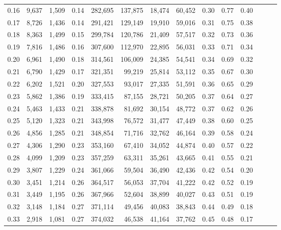 \begin{tabular}{rrrrrrrrrrrrrr}
0.16 &   9,637 &  1,509 &  0.14 &  282,695 &  137,875 &  18,474 &  60,452 &  0.30 &  0.77 &      0.40 \\
0.17 &   8,726 &  1,436 &  0.14 &  291,421 &  129,149 &  19,910 &  59,016 &  0.31 &  0.75 &      0.38 \\
0.18 &   8,363 &  1,499 &  0.15 &  299,784 &  120,786 &  21,409 &  57,517 &  0.32 &  0.73 &      0.36 \\
0.19 &   7,816 &  1,486 &  0.16 &  307,600 &  112,970 &  22,895 &  56,031 &  0.33 &  0.71 &      0.34 \\
0.20 &   6,961 &  1,490 &  0.18 &  314,561 &  106,009 &  24,385 &  54,541 &  0.34 &  0.69 &      0.32 \\
0.21 &   6,790 &  1,429 &  0.17 &  321,351 &   99,219 &  25,814 &  53,112 &  0.35 &  0.67 &      0.30 \\
0.22 &   6,202 &  1,521 &  0.20 &  327,553 &   93,017 &  27,335 &  51,591 &  0.36 &  0.65 &      0.29 \\
0.23 &   5,862 &  1,386 &  0.19 &  333,415 &   87,155 &  28,721 &  50,205 &  0.37 &  0.64 &      0.27 \\
0.24 &   5,463 &  1,433 &  0.21 &  338,878 &   81,692 &  30,154 &  48,772 &  0.37 &  0.62 &      0.26 \\
0.25 &   5,120 &  1,323 &  0.21 &  343,998 &   76,572 &  31,477 &  47,449 &  0.38 &  0.60 &      0.25 \\
0.26 &   4,856 &  1,285 &  0.21 &  348,854 &   71,716 &  32,762 &  46,164 &  0.39 &  0.58 &      0.24 \\
0.27 &   4,306 &  1,290 &  0.23 &  353,160 &   67,410 &  34,052 &  44,874 &  0.40 &  0.57 &      0.22 \\
0.28 &   4,099 &  1,209 &  0.23 &  357,259 &   63,311 &  35,261 &  43,665 &  0.41 &  0.55 &      0.21 \\
0.29 &   3,807 &  1,229 &  0.24 &  361,066 &   59,504 &  36,490 &  42,436 &  0.42 &  0.54 &      0.20 \\
0.30 &   3,451 &  1,214 &  0.26 &  364,517 &   56,053 &  37,704 &  41,222 &  0.42 &  0.52 &      0.19 \\
0.31 &   3,449 &  1,195 &  0.26 &  367,966 &   52,604 &  38,899 &  40,027 &  0.43 &  0.51 &      0.19 \\
0.32 &   3,148 &  1,184 &  0.27 &  371,114 &   49,456 &  40,083 &  38,843 &  0.44 &  0.49 &      0.18 \\
0.33 &   2,918 &  1,081 &  0.27 &  374,032 &   46,538 &  41,164 &  37,762 &  0.45 &  0.48 &      0.17 \\

\end{tabular}
